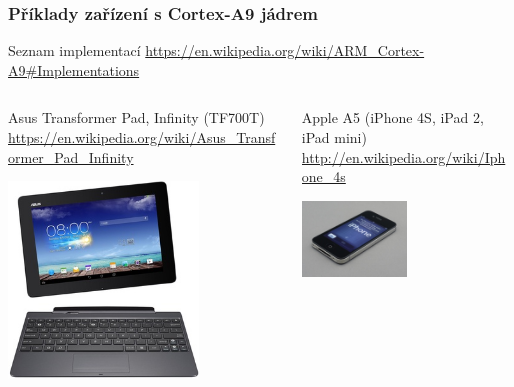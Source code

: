\documentclass{beamer}
\begin{document}
\begin{frame}
\frametitle{Příklady zařízení s Cortex-A9 jádrem}

{ \scriptsize
Seznam implementací \url{https://en.wikipedia.org/wiki/ARM\_Cortex-A9\#Implementations}
}
\vspace{2mm}
\begin{columns}
\begin{column}{0.5\textwidth}
  {\scriptsize
  Asus Transformer Pad, Infinity (TF700T) \tiny \linebreak
  \url{https://en.wikipedia.org/wiki/Asus_Transformer_Pad_Infinity}
  }
  \begin{center}
    \includegraphics[width=0.7\textwidth]{fig/asus-transformer.jpg}
  \end{center}
\end{column}
\begin{column}{0.5\textwidth}
  {\scriptsize
  Apple A5 (iPhone 4S, iPad 2, iPad mini) \tiny \linebreak
  \url{http://en.wikipedia.org/wiki/Iphone_4s}
  }
  \begin{center}
    \includegraphics[width=0.5\textwidth]{fig/apple-iphone-with-a5.jpg}

\end{center}
\end{column}
\end{columns}
\end{frame}
\end{document}
